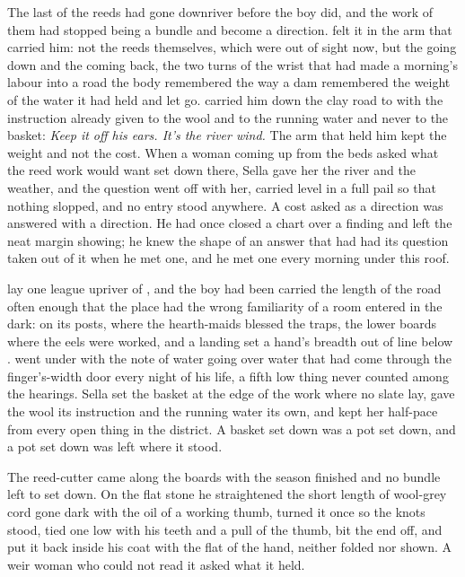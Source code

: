 
The last of the reeds had gone downriver before the boy did, and the work of them had stopped being a bundle and become a direction.  felt it in the arm that carried him: not the reeds themselves, which were out of sight now, but the going down and the coming back, the two turns of the wrist that had made a morning's labour into a road the body remembered the way a dam remembered the weight of the water it had held and let go.  carried him down the clay road to  with the instruction already given to the wool and to the running water and never to the basket: \emph{Keep it off his ears. It's the river wind.} The arm that held him kept the weight and not the cost. When a woman coming up from the beds asked what the reed work would want set down there, Sella gave her the river and the weather, and the question went off with her, carried level in a full pail so that nothing slopped, and no entry stood anywhere. A cost asked as a direction was answered with a direction. He had once closed a chart over a finding and left the neat margin showing; he knew the shape of an answer that had had its question taken out of it when he met one, and he met one every morning under this roof.

 lay one league upriver of , and the boy had been carried the length of the road often enough that the place had the wrong familiarity of a room entered in the dark:  on its posts,  where the hearth-maids blessed the traps, the lower boards where the eels were worked, and a landing set a hand's breadth out of line below .  went under  with the note of water going over water that had come through the finger's-width door every night of his life, a fifth low thing never counted among the hearings. Sella set the basket at the edge of the work where no slate lay, gave the wool its instruction and the running water its own, and kept her half-pace from every open thing in the district. A basket set down was a pot set down, and a pot set down was left where it stood.

The reed-cutter came along the boards with the season finished and no bundle left to set down. On the flat stone he straightened the short length of wool-grey cord gone dark with the oil of a working thumb, turned it once so the knots stood, tied one low with his teeth and a pull of the thumb, bit the end off, and put it back inside his coat with the flat of the hand, neither folded nor shown. A weir woman who could not read it asked what it held.

